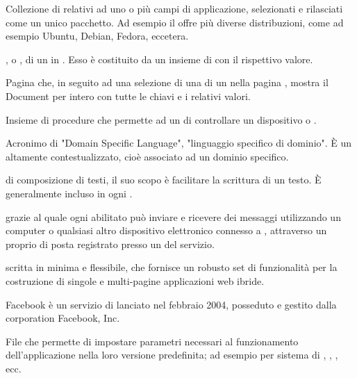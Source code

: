 { 
{Collezione di  relativi ad uno o più campi di applicazione, selezionati e rilasciati come un unico pacchetto. Ad esempio il   offre più diverse distribuzioni, come ad esempio Ubuntu, Debian, Fedora, eccetera.}

{, o , di un  in . Esso è costituito da un insieme di  con il rispettivo valore.}

{Pagina che, in seguito ad una selezione di una  di un  nella pagina , mostra il Document per intero con tutte le chiavi e i relativi valori.}


{Insieme di procedure che permette ad un  di controllare un dispositivo  o .}

{Acronimo di "Domain Specific Language", "linguaggio specifico di dominio". \`{E} un  altamente contestualizzato, cioè associato ad un dominio specifico.} 




{ di composizione di testi, il suo scopo è facilitare la scrittura di un testo. \`{E} generalmente incluso in ogni .}

{  grazie al quale ogni  abilitato può inviare e ricevere dei messaggi utilizzando un computer o qualsiasi altro dispositivo elettronico connesso a , attraverso un proprio  di posta registrato presso un  del servizio.}


{ scritta in  minima e flessibile, che fornisce un robusto set di funzionalità per la costruzione di singole e multi-pagine applicazioni web ibride.}




{Facebook è un servizio di  lanciato nel febbraio 2004, posseduto e gestito dalla corporation Facebook, Inc.}

{File che permette di impostare parametri necessari al funzionamento dell'applicazione nella loro versione predefinita; ad esempio  per sistema di , , , ecc.}

}
